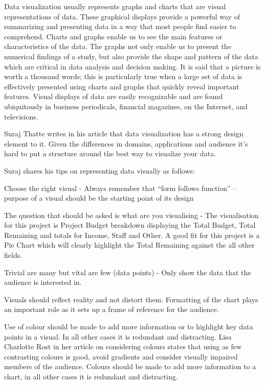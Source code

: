 Data visualization usually represents graphs and charts that are visual representations of data. These graphical displays provide a powerful way of summarizing and presenting data in a way that most people find easier to comprehend. Charts and graphs enable us to see the main features or characteristics of the data. The graphs not only enable us to present the numerical findings of a study, but also provide the shape and pattern of the data which are critical in data analysis and decision making. It is said that a picture is worth a thousand words; this is particularly true when a large set of data is effectively presented using charts and graphs that quickly reveal important features. Visual displays of data are easily recognizable and are found ubiquitously in business periodicals, financial magazines, on the Internet, and televisions. \cite{VisualizationOverview}

Suraj Thatte writes in his article that data visualization has a strong design element to it. Given the differences in domains, applications and audience it’s hard to put a structure around the best way to visualize your data. \cite{Thatte2019}

Suraj shares his tips on representing data visually as follows:

	Choose the right visual - Always remember that “form follows function” – purpose of a visual should be the starting point of its design
	
	The question that should be asked is what are you visualising - The visualisation for this project is Project Budget breakdown displaying the Total Budget, Total Remaining and totals for Income, Staff and Other. A good fit for this project is a Pie Chart which will clearly highlight the Total Remaining against the all other fields.

	Trivial are many but vital are few (data points) - Only show the data that the audience is interested in.

	Visuals should reflect reality and not distort them. Formatting of the chart plays an important role as it sets up a frame of reference for the audience.

	Use of colour should be made to add more information or to highlight key data points in a visual. In all other cases it is redundant and distracting. Lisa Charlotte Rost in her article on considering colours states that using as few contrasting colours is good, avoid gradients and consider visually impaired members of the audience. Colours should be made to add more information to a chart, in all other cases it is redundant and distracting. \cite{Rost2018}

